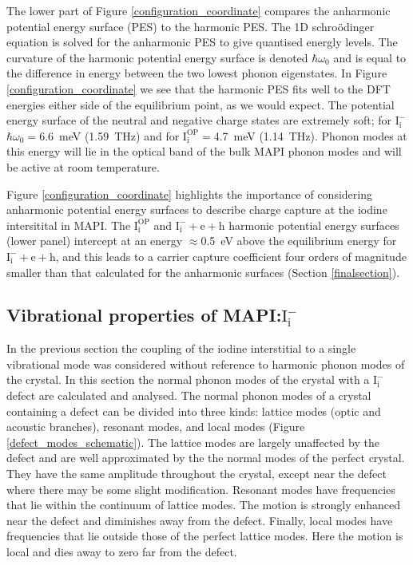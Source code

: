 The lower part of Figure \ref{configuration_coordinate} compares the anharmonic potential energy surface (PES) to the harmonic PES. The 1D schro\"{o}dinger equation is solved for the anharmonic PES to give quantised energly levels. The curvature of the harmonic potential energy surface is denoted $\hbar\omega_0$ and is equal to the difference in energy between the two lowest phonon eigenstates. In Figure \ref{configuration_coordinate} we see that the harmonic PES fits well to the DFT energies either side of the equilibrium point, as we would expect. The potential energy surface of the neutral and negative charge states are extremely soft; for $\mathrm{I}_\mathrm{i}^-$ $\hbar\omega_0=$\SI{6.6}{meV} (\SI{1.59}{\tera\hertz}) and for $\mathrm{I}_\mathrm{i}^\mathrm{OP}=$\SI{4.7}{meV} (\SI{1.14}{\tera\hertz}). Phonon modes at this energy will lie in the optical band of the bulk MAPI phonon modes and will be active at room temperature.

Figure \ref{configuration_coordinate} highlights the importance of considering anharmonic potential energy surfaces to describe charge capture at the iodine intersitital in MAPI. The $\mathrm{I}_\mathrm{i}^\mathrm{OP}$ and $\mathrm{I}_\mathrm{i}^-+\textrm{e}+\textrm{h}$ harmonic potential energy surfaces (lower panel) intercept at an energy $\approx$\SI{0.5}{eV} above the equilibrium energy for $\mathrm{I}_\mathrm{i}^-+\textrm{e}+\textrm{h}$, and this leads to a carrier capture coefficient four orders of magnitude smaller than that calculated for the anharmonic surfaces (Section \ref{finalsection}).



\subsection{Vibrational properties of MAPI:$\mathrm{I}_\mathrm{i}^-$}

In the previous section the coupling of the iodine interstitial to a single vibrational mode was considered without reference to harmonic phonon modes of the crystal.
In this section the normal phonon modes of the crystal with a $\mathrm{I}_\mathrm{i}^-$ defect are calculated and analysed.
The normal phonon modes of a crystal containing a defect can be divided into three kinds: lattice modes (optic and acoustic branches), resonant modes, and local modes (Figure \ref{defect_modes_schematic}).\autocite{Stoneham defect defect processes}
The lattice modes are largely unaffected by the defect and are well approximated by the the normal modes of the perfect crystal. They have the same amplitude throughout the crystal, except near the defect where there may be some slight modification. 
Resonant modes have frequencies that lie within the continuum of lattice modes. The motion is strongly enhanced near the defect and diminishes away from the defect.
Finally, local modes have frequencies that lie outside those of the perfect lattice modes. Here the motion is local and dies away to zero far from the defect.

